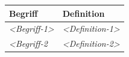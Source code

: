 \documentclass[]{article}
\begin{document}
\begin{longtable}[]{@{}ll@{}}
\toprule
\begin{minipage}[b]{0.31\columnwidth}\raggedright
Begriff\strut
\end{minipage} & \begin{minipage}[b]{0.63\columnwidth}\raggedright
Definition\strut
\end{minipage}\tabularnewline
\midrule
\endhead
\begin{minipage}[t]{0.31\columnwidth}\raggedright
\emph{\textless{}Begriff-1\textgreater{}}\strut
\end{minipage} & \begin{minipage}[t]{0.63\columnwidth}\raggedright
\emph{\textless{}Definition-1\textgreater{}}\strut
\end{minipage}\tabularnewline
\begin{minipage}[t]{0.31\columnwidth}\raggedright
\emph{\textless{}Begriff-2}\strut
\end{minipage} & \begin{minipage}[t]{0.63\columnwidth}\raggedright
\emph{\textless{}Definition-2\textgreater{}}\strut
\end{minipage}\tabularnewline
\bottomrule
\end{longtable}
\end{document}
